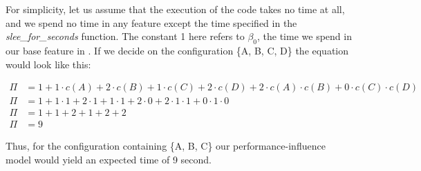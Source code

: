 For simplicity, let us assume that the execution of the code takes no time at all, and we spend no time in any feature except the time specified in the 
\textit{slee\_for\_seconds} function.
The constant 1 here refers to $\beta_0$, the time we spend in our base feature in .
If we decide on the configuration \{A, B, C, D\} the equation would look like this:

\begin{align*}
    \Pi &= 1 + 1 \cdot c(A) + 2\cdot c(B) + 1\cdot c(C) + 2\cdot c(D) + 2 \cdot c(A)\cdot c(B) + 0\cdot c(C) \cdot c(D) \\
    \Pi &= 1 + 1 \cdot 1 + 2 \cdot 1 + 1 \cdot 1 + 2 \cdot 0 + 2 \cdot 1 \cdot 1 + 0 \cdot 1 \cdot 0 \\
    \Pi &= 1 + 1 + 2 + 1 + 2 + 2 \\
    \Pi &= 9
\end{align*}

Thus, for the configuration containing \{A, B, C\} our performance-influence model would yield an expected time of 9 second.